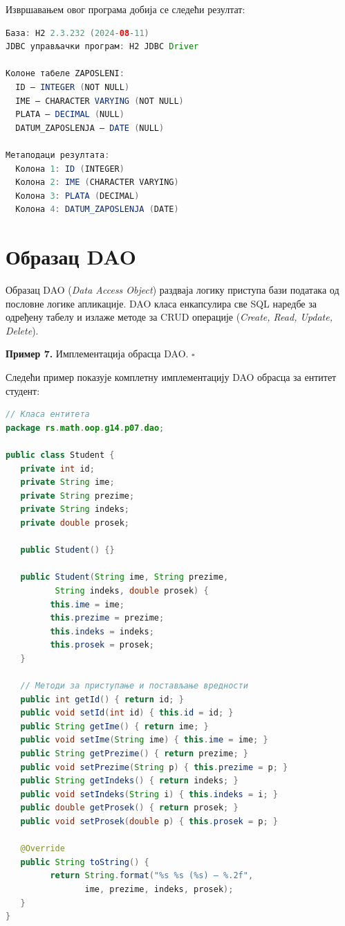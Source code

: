 Извршавањем овог програма добија се следећи резултат:


\begin{lstlisting}[language=Java]
База: H2 2.3.232 (2024-08-11)
JDBC управљачки програм: H2 JDBC Driver
 
Колоне табеле ZAPOSLENI:
  ID – INTEGER (NOT NULL)
  IME – CHARACTER VARYING (NOT NULL)
  PLATA – DECIMAL (NULL)
  DATUM_ZAPOSLENJA – DATE (NULL)
 
Метаподаци резултата:
  Колона 1: ID (INTEGER)
  Колона 2: IME (CHARACTER VARYING)
  Колона 3: PLATA (DECIMAL)
  Колона 4: DATUM_ZAPOSLENJA (DATE)
\end{lstlisting}


\section{Образац DAO}

Образац DAO (\textit{Data Access Object}) раздваја логику приступа бази података од пословне логике апликације. DAO класа енкапсулира све SQL наредбе за одређену табелу и излаже методе за CRUD операције (\textit{Create, Read, Update, Delete}).


\bigskip

\noindent \textbf{Пример 7.} Имплементација обрасца DAO. $\square$

\medskip

Следећи пример показује комплетну имплементацију DAO обрасца за ентитет студент:


\begin{lstlisting}[language=Java]
// Класа ентитета
package rs.math.oop.g14.p07.dao;
 
public class Student {
   private int id;
   private String ime;
   private String prezime;
   private String indeks;
   private double prosek;
 
   public Student() {}
 
   public Student(String ime, String prezime,
          String indeks, double prosek) {
         this.ime = ime;
         this.prezime = prezime;
         this.indeks = indeks;
         this.prosek = prosek;
   }
 
   // Методи за приступање и постављање вредности
   public int getId() { return id; }
   public void setId(int id) { this.id = id; }
   public String getIme() { return ime; }
   public void setIme(String ime) { this.ime = ime; }
   public String getPrezime() { return prezime; }
   public void setPrezime(String p) { this.prezime = p; }
   public String getIndeks() { return indeks; }
   public void setIndeks(String i) { this.indeks = i; }
   public double getProsek() { return prosek; }
   public void setProsek(double p) { this.prosek = p; }
 
   @Override
   public String toString() {
         return String.format("%s %s (%s) – %.2f",
                ime, prezime, indeks, prosek);
   }
}
\end{lstlisting}



